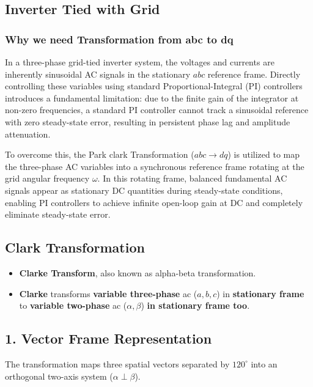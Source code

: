 \newpage
\subsection{Inverter Tied with Grid}
\subsubsection{Why we need Transformation from abc to dq}
In a three-phase grid-tied inverter system, the voltages and currents are inherently sinusoidal AC signals in the stationary $abc$ reference frame. Directly controlling these variables using standard Proportional-Integral (PI) controllers introduces a fundamental limitation: due to the finite gain of the integrator at non-zero frequencies, a standard PI controller cannot track a sinusoidal reference with zero steady-state error, resulting in persistent phase lag and amplitude attenuation.

To overcome this, the Park clark Transformation ($abc \to dq$) is utilized to map the three-phase AC variables into a synchronous reference frame rotating at the grid angular frequency $\omega$. In this rotating frame, balanced fundamental AC signals appear as stationary DC quantities during steady-state conditions, enabling PI controllers to achieve infinite open-loop gain at DC and completely eliminate steady-state error\cite{singh2020}.

\subsection{Clark Transformation}
\begin{itemize}
    \item \textbf{Clarke Transform}, also known as alpha-beta transformation.
    \item \textbf{Clarke} transforms \textbf{variable three-phase} ac ($a,b,c$) in \textbf{stationary frame} to \textbf{variable two-phase} ac ($\alpha,\beta$) \textbf{in stationary frame too}.
\end{itemize}

\vspace{0.5cm}

\subsection*{1. Vector Frame Representation}

The transformation maps three spatial vectors separated by $120^\circ$ into an orthogonal two-axis system ($\alpha \perp \beta$). 

